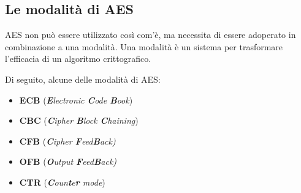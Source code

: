 \subsection{Le modalità di AES} %

 

\textsf{\small AES non può essere utilizzato così com'è, ma necessita di essere adoperato in combinazione a una modalità. } %
\textsf{\small Una modalità è un sistema per trasformare l'efficacia di un algoritmo crittografico.} %

     

\textsf{\small Di seguito, alcune delle modalità di AES: }

\begin{itemize} %
	\item \textsf{\small \textbf{ECB} (\emph{\textbf{E}lectronic \textbf{C}ode \textbf{B}ook})}
	\item \textsf{\small \textbf{CBC} (\emph{\textbf{C}ipher \textbf{B}lock \textbf{C}haining})}
	\item \textsf{\small \textbf{CFB} (\emph{\textbf{C}ipher \textbf{F}eed\textbf{B}ack)}}
	\item \textsf{\small \textbf{OFB} (\emph{\textbf{O}utput \textbf{F}eed\textbf{B}ack)}}
	\item \textsf{\small \textbf{CTR} (\emph{\textbf{C}oun\textbf{t}e\textbf{r} mode})}
\end{itemize} 


\newpage

